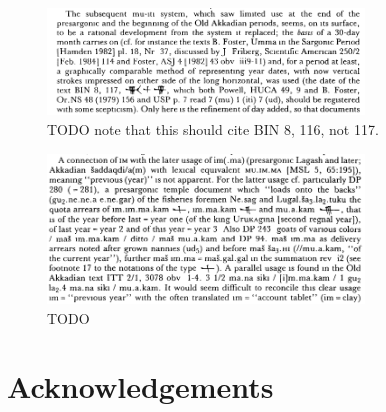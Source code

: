 \documentclass[10pt, a4paper, twoside]{article}
\begin{document}
\begin{figure}[H]
  \begin{center}
  \includegraphics[width=0.75\textwidth]{eng88-p144-n17.png}
  \caption{TODO note that this should cite BIN 8, 116, not 117.}
  \end{center}
\end{figure}
\begin{figure}[H]
  \begin{center}
  \includegraphics[width=0.75\textwidth]{eng88-p166-n37.png}
  \caption{TODO}
  \end{center}
\end{figure}

\section*{Acknowledgements}
\end{document}

